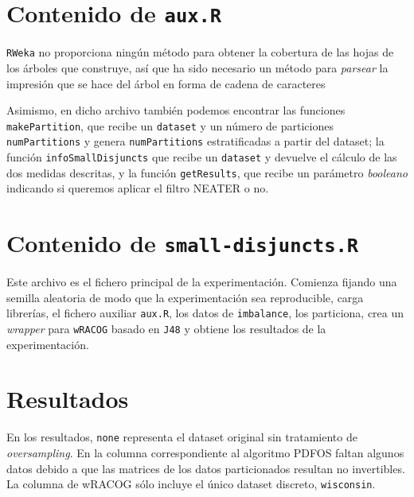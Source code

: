 \section{Contenido de \texttt{aux.R}}
\texttt{RWeka} no proporciona ningún método para obtener la cobertura de las hojas de los árboles que construye, así que
ha sido necesario un método para \textit{parsear} la impresión que se hace del árbol en forma de cadena de caracteres



Asimismo, en dicho archivo también podemos encontrar las funciones \texttt{makePartition}, que recibe un \texttt{dataset}
y un número de particiones \texttt{numPartitions} y genera \texttt{numPartitions} estratificadas a partir del dataset; la
función \texttt{infoSmallDisjuncts} que recibe un \texttt{dataset} y devuelve el cálculo de las dos medidas descritas, y 
la función \texttt{getResults}, que recibe un parámetro \textit{booleano} indicando si queremos aplicar el filtro NEATER
o no.
\clearpage


\section{Contenido de \texttt{small-disjuncts.R}}
Este archivo es el fichero principal de la experimentación. Comienza fijando una semilla aleatoria de modo que la experimentación
sea reproducible, carga librerías, el fichero auxiliar \texttt{aux.R}, los datos de \texttt{imbalance}, los particiona,
crea un \textit{wrapper} para \texttt{wRACOG} basado en \texttt{J48} y obtiene los resultados de la experimentación.

\section{Resultados}
En los resultados, \texttt{none} representa el dataset original sin tratamiento de \textit{oversampling}. En la columna
correspondiente al algoritmo PDFOS faltan algunos datos debido a que las matrices de los datos particionados resultan
no invertibles. La columna de wRACOG sólo incluye el único dataset discreto, \texttt{wisconsin}.
